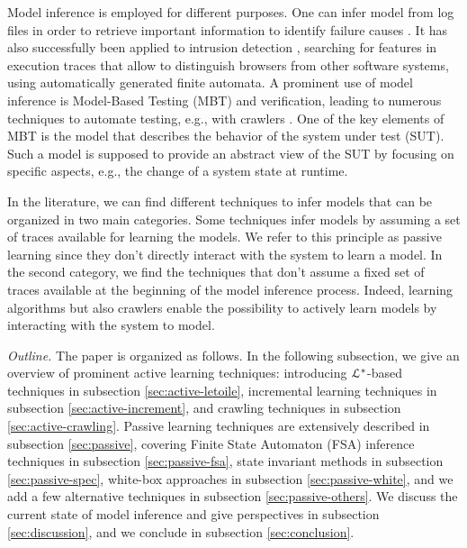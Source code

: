 Model inference is employed for different purposes. One can infer
model from log files in order to retrieve important information
to identify failure causes \cite{4700316}. It has also
successfully been applied to intrusion detection \cite{debar00},
searching for features in execution traces that allow to
distinguish browsers from other software systems, using
automatically generated finite automata.
A prominent use of model inference is Model-Based Testing (MBT)
and verification, leading to numerous techniques to automate
testing, e.g., with crawlers
\cite{Amalfitano:2012:UGR:2351676.2351717,Joorabchi:2012:REI:2420240.2420457,MobiGUITARIEEESoftware2014}.
One of the key elements of MBT is the model that describes the
behavior of the system under test (SUT). Such a model is supposed
to provide an abstract view of the SUT by focusing on specific
aspects, e.g., the change of a system state at runtime.

In the literature, we can find different techniques to infer
models that can be organized in two main categories. Some
techniques infer models by assuming a set of traces available for
learning the models. We refer to this principle as passive
learning since they don't directly interact with the system to
learn a model. In the second category, we find the techniques
that don't assume a fixed set of traces available at the
beginning of the model inference process. Indeed, learning
algorithms but also crawlers enable the possibility to actively
learn models by interacting with the system to model.

\textit{Outline.} The paper is organized as follows. In the
following subsection, we give an overview of prominent active
learning techniques: introducing $\EuScript{L}^*$-based
techniques in subsection \ref{sec:active-letoile}, incremental
learning techniques in subsection \ref{sec:active-increment}, and
crawling techniques in subsection \ref{sec:active-crawling}.
Passive learning techniques are extensively described in subsection
\ref{sec:passive}, covering Finite State Automaton (FSA)
inference techniques in subsection \ref{sec:passive-fsa},
state invariant methods in subsection \ref{sec:passive-spec},
white-box approaches in subsection \ref{sec:passive-white}, and we
add a few alternative techniques in subsection
\ref{sec:passive-others}. We discuss the current state of model
inference and give perspectives in subsection \ref{sec:discussion},
and we conclude in subsection \ref{sec:conclusion}.


